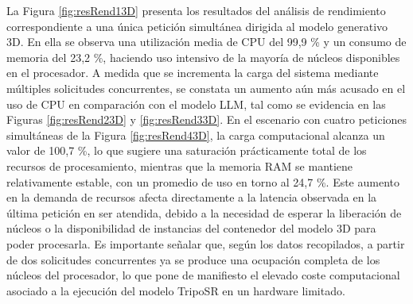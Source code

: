 La Figura \ref{fig:resRend13D} presenta los resultados del análisis de rendimiento correspondiente a una única petición simultánea dirigida al modelo generativo 3D.
En ella se observa una utilización media de CPU del 99,9 \% y un consumo de memoria del 23,2 \%, haciendo uso intensivo de la mayoría de núcleos disponibles en el procesador. A medida que se incrementa la carga del sistema mediante múltiples solicitudes concurrentes, se constata un aumento aún más acusado en el uso de CPU en comparación con el modelo LLM, tal como se evidencia en las Figuras \ref{fig:resRend23D} y \ref{fig:resRend33D}. En el escenario con cuatro peticiones simultáneas de la Figura \ref{fig:resRend43D}, la carga computacional alcanza un valor de 100,7 \%, lo que sugiere una saturación prácticamente total de los recursos de procesamiento, mientras que la memoria RAM se mantiene relativamente estable, con un promedio de uso en torno al 24,7 \%. Este aumento en la demanda de recursos afecta directamente a la latencia observada en la última petición en ser atendida, debido a la necesidad de esperar la liberación de núcleos o la disponibilidad de instancias del contenedor del modelo 3D para poder procesarla. Es importante señalar que, según los datos recopilados, a partir de dos solicitudes concurrentes ya se produce una ocupación completa de los núcleos del procesador, lo que pone de manifiesto el elevado coste computacional asociado a la ejecución del modelo TripoSR en un hardware limitado.




